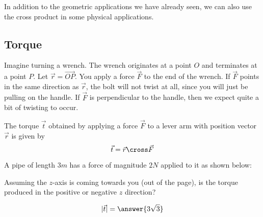 \documentclass{ximera}
\begin{document}
In addition to the geometric applications we have already seen, we can
also use the cross product in some physical applications.



\subsection{Torque}

Imagine turning a wrench.  The wrench originates at a point $O$ and
terminates at a point $P$.  Let $\vec{r} = \overrightarrow{OP}$.  You
apply a force $\vec{F}$ to the end of the wrench.  If $\vec{F}$ points
in the same direction as $\vec{r}$, the bolt will not twist at all,
since you will just be pulling on the handle.  If $\vec{F}$ is
perpendicular to the handle, then we expect quite a bit of twisting to
occur.

\begin{definition}
  The torque $\vec{t}$ obtained by applying a force $\vec{F}$ to a
  lever arm with position vector $\vec{r}$ is given by
  \[
  \vec{t} = \vec{r} \cross \vec{F} 
  \]
\end{definition}

\begin{question}
  A pipe of length $3 \unit{m}$ has a force of magnitude $2 \unit{N}$
  applied to it as shown below:
  \begin{image}
  \end{image}
  Assuming the $z$-axis is coming towards you (out of the page), is
  the torque produced in the positive or negative $z$ direction?
  \begin{prompt}
  \begin{multipleChoice}
  \end{multipleChoice}  
  \[
  |\vec{t}| = \answer{3\sqrt{3}}
  \]
  \end{prompt}
\end{question}
\end{document}
